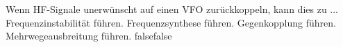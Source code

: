     {Wenn HF-Signale unerwünscht auf einen VFO zurückkoppeln, kann dies zu ...}
    {Frequenzinstabilität führen.}
    {Frequenzsynthese führen.}
    {Gegenkopplung führen.}
    {Mehrwegeausbreitung führen.}
    {false}{false}